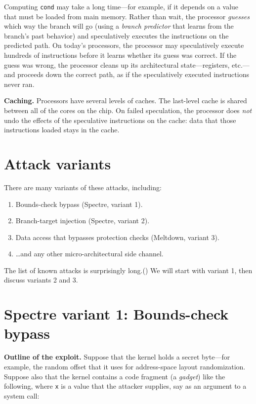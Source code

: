 \documentclass[
  letterpaper,
]{scrbook}
\theoremstyle{definition}
\theoremstyle{plain}
\theoremstyle{plain}
\theoremstyle{remark}
\begin{document}
Computing \texttt{cond} may take a long time---for example, if it
depends on a value that must be loaded from main memory. Rather than
wait, the processor \emph{guesses} which way the branch will go (using a
\emph{branch predictor} that learns from the branch's past behavior) and
speculatively executes the instructions on the predicted path. On
today's processors, the processor may speculatively execute hundreds of
instructions before it learns whether its guess was correct. If the
guess was wrong, the processor cleans up its architectural
state---registers, etc.---and proceeds down the correct path, as if the
speculatively executed instructions never ran.

\textbf{Caching.} Processors have several levels of caches. The
last-level cache is shared between all of the cores on the chip. On
failed speculation, the processor does \emph{not} undo the effects of
the speculative instructions on the cache: data that those instructions
loaded stays in the cache.

\section{Attack variants}\label{attack-variants}

There are many variants of these attacks, including:

\begin{enumerate}
\def\labelenumi{\arabic{enumi}.}
\item
  Bounds-check bypass (Spectre, variant 1).
\item
  Branch-target injection (Spectre, variant 2).
\item
  Data access that bypasses protection checks (Meltdown, variant 3).
\item
  \ldots and any other micro-architectural side channel.
\end{enumerate}

The list of known attacks is surprisingly
long.() We will
start with variant 1, then discuss variants 2 and 3.

\section{Spectre variant 1: Bounds-check bypass}\label{sec-sc-v1}

\textbf{Outline of the exploit.} Suppose that the kernel holds a secret
byte---for example, the random offset that it uses for address-space
layout randomization. Suppose also that the kernel contains a code
fragment (a \emph{gadget}) like the following, where \texttt{x} is a
value that the attacker supplies, say as an argument to a system call:
\end{document}
